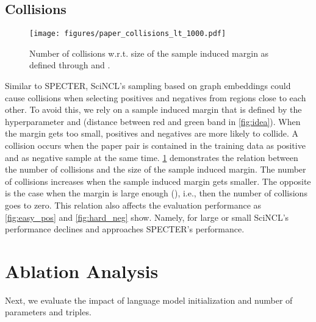 \documentclass[11pt]{article}
\begin{document}
\subsection{Collisions} \label{ssec:collisions}


\begin{figure}[ht]
\centering
\texttt{[image: figures/paper\_collisions\_lt\_1000.pdf]}

\caption{\label{fig:collisions}Number of collisions w.r.t. size of the sample induced margin as defined through   and .}
\end{figure}

Similar to SPECTER, SciNCL's sampling based on graph embeddings could cause collisions when selecting positives and negatives from regions close to each other. 
To avoid this, we rely on a sample induced margin that is defined by the hyperparameter  and  (distance between red and green band in \cref{fig:idea}).
When the margin gets too small, positives and negatives are more likely to collide. 
A collision occurs when the paper pair  is contained in the training data as positive and as negative sample at the same time.
\cref{fig:collisions} demonstrates the relation between the number of collisions and the size of the sample induced margin. 
The number of collisions increases when the sample induced margin gets smaller.
The opposite is the case  when the margin is large enough (), i.e., then the number of collisions goes to zero.
This relation also affects the evaluation performance as \cref{fig:easy_pos} and \cref{fig:hard_neg} show. 
Namely, for large  or small   SciNCL's performance declines and approaches SPECTER's performance.



\section{Ablation Analysis} \label{sec:ablation-analysis}

Next, we evaluate the impact of language model initialization and number of parameters and triples.
\end{document}

